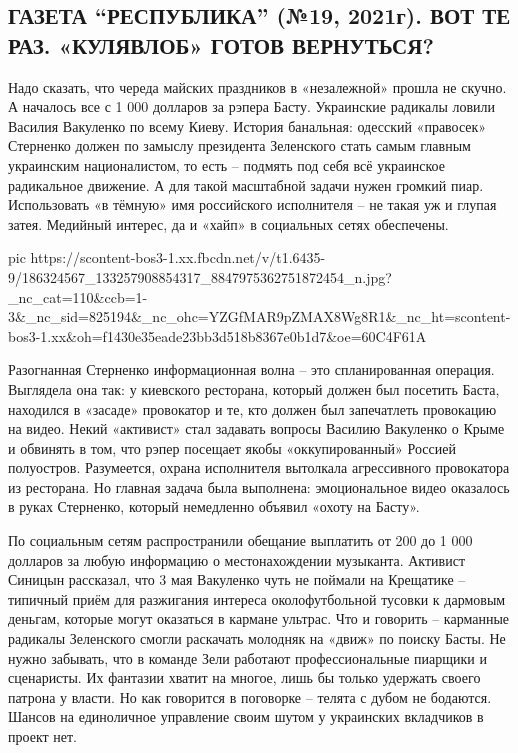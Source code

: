  
 
 
 
 
\subsection{ГАЗЕТА \enquote{РЕСПУБЛИКА} (№19, 2021г).  ВОТ ТЕ РАЗ. «КУЛЯВЛОБ» ГОТОВ ВЕРНУТЬСЯ?}
\label{sec:14_05_2021.fb.respublikalnr.1.jacenjuk_vozvraschenie}

Надо сказать, что череда майских праздников в «незалежной» прошла не скучно. А
началось все с 1 000 долларов за рэпера Басту. Украинские радикалы ловили
Василия Вакуленко по всему Киеву. История банальная: одесский «правосек»
Стерненко должен по замыслу президента Зеленского стать самым главным
украинским националистом, то есть – подмять под себя всё украинское радикальное
движение. А для такой масштабной задачи нужен громкий пиар. Использовать «в
тёмную» имя российского исполнителя – не такая уж и глупая затея. Медийный
интерес, да и «хайп» в социальных сетях обеспечены.


\ifcmt
  pic https://scontent-bos3-1.xx.fbcdn.net/v/t1.6435-9/186324567_133257908854317_8847975362751872454_n.jpg?_nc_cat=110&ccb=1-3&_nc_sid=825194&_nc_ohc=YZGfMAR9pZMAX8Wg8R1&_nc_ht=scontent-bos3-1.xx&oh=f1430e35eade23bb3d518b8367e0b1d7&oe=60C4F61A
\fi


Разогнанная Стерненко информационная волна – это спланированная операция.
Выглядела она так: у киевского ресторана, который должен был посетить Баста,
находился в «засаде» провокатор и те, кто должен был запечатлеть провокацию на
видео. Некий «активист» стал задавать вопросы Василию Вакуленко о Крыме и
обвинять в том, что рэпер посещает якобы «оккупированный» Россией полуостров.
Разумеется, охрана исполнителя вытолкала агрессивного провокатора из ресторана.
Но главная задача была выполнена: эмоциональное видео оказалось в руках
Стерненко, который немедленно объявил «охоту на Басту».

По социальным сетям распространили обещание выплатить от 200 до 1 000 долларов
за любую информацию о местонахождении музыканта. Активист Синицын рассказал,
что 3 мая Вакуленко чуть не поймали на Крещатике – типичный приём для
разжигания интереса околофутбольной тусовки к дармовым деньгам, которые могут
оказаться в кармане ультрас. Что и говорить – карманные радикалы Зеленского
смогли раскачать молодняк на «движ» по поиску Басты. Не нужно забывать, что в
команде Зели работают профессиональные пиарщики и сценаристы. Их фантазии
хватит на многое, лишь бы только удержать своего патрона у власти. Но как
говорится в поговорке – телята с дубом не бодаются. Шансов на единоличное
управление своим шутом у украинских вкладчиков в проект нет.

